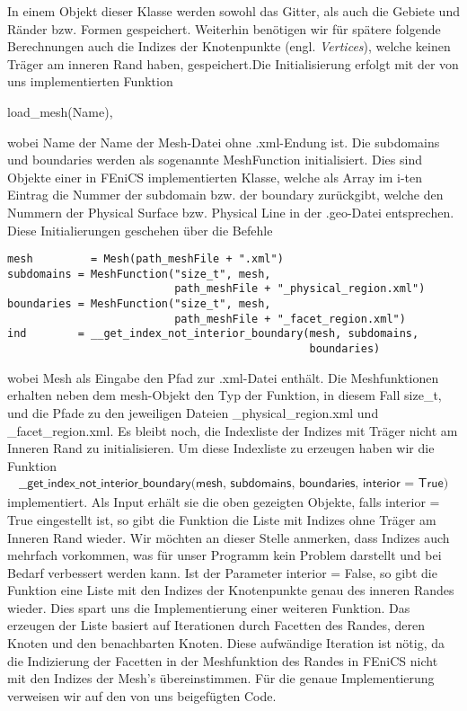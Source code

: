 \documentclass[bibliography=totoc,12pt,a4paper]{scrartcl}
\theoremstyle{exampstyle}
\numberwithin{equation}{section}
\begin{document}
In einem Objekt dieser Klasse werden sowohl das Gitter, als auch die Gebiete und Ränder bzw. Formen gespeichert. Weiterhin benötigen wir für spätere folgende Berechnungen auch die Indizes der Knotenpunkte (engl. \textit{Vertices}), welche keinen Träger am inneren Rand haben, gespeichert.Die Initialisierung erfolgt mit der von uns implementierten Funktion 
\begin{center}
\textsf{load\_mesh(Name)},
\end{center} wobei \textsf{Name} der Name der Mesh-Datei ohne \textsf{.xml}-Endung ist. Die \textsf{subdomains} und \textsf{boundaries} werden als sogenannte \textsf{MeshFunction} initialisiert. Dies sind Objekte einer in FEniCS implementierten Klasse, welche als Array im \textsf{i}-ten Eintrag die Nummer der \textsf{subdomain} bzw. der \textsf{boundary} zurückgibt, welche den Nummern der \textsf{Physical Surface} bzw. \textsf
{Physical Line}  in der \textsf{.geo}-Datei entsprechen. Diese Initialierungen geschehen über die Befehle

\begin{lstlisting}
mesh 	     = Mesh(path_meshFile + ".xml")
subdomains = MeshFunction("size_t", mesh,
                          path_meshFile + "_physical_region.xml")
boundaries = MeshFunction("size_t", mesh, 
                          path_meshFile + "_facet_region.xml")
ind        = __get_index_not_interior_boundary(mesh, subdomains, 
                                               boundaries)  
\end{lstlisting}
wobei \textsf{Mesh} als Eingabe den Pfad zur \textsf{.xml}-Datei enthält. Die Meshfunktionen erhalten neben dem \textsf{mesh}-Objekt den Typ der Funktion, in diesem Fall \textsf{size\_t}, und die Pfade zu den jeweiligen Dateien \textsf{\_physical\_region.xml} und \textsf{\_facet\_region.xml}. Es bleibt noch, die Indexliste der Indizes mit Träger nicht am Inneren Rand zu initialisieren. Um diese Indexliste zu erzeugen haben wir die Funktion 
\begin{align*}
\textsf{\_\_get\_index\_not\_interior\_boundary(mesh, subdomains, 
boundaries, interior = True)}  
\end{align*}
implementiert. Als Input erhält sie die oben gezeigten Objekte, falls \textsf{interior = True} eingestellt ist, so gibt die Funktion die Liste mit Indizes ohne Träger am Inneren Rand wieder. Wir möchten an dieser Stelle anmerken, dass Indizes auch mehrfach vorkommen, was für unser Programm kein Problem darstellt und bei Bedarf verbessert werden kann. Ist der Parameter \textsf{interior = False}, so gibt die Funktion eine Liste mit den Indizes der Knotenpunkte genau des inneren Randes wieder. Dies spart uns die Implementierung einer weiteren Funktion. Das erzeugen der Liste basiert auf Iterationen durch Facetten des Randes, deren Knoten und den benachbarten Knoten. Diese aufwändige Iteration ist nötig, da die Indizierung der Facetten in der Meshfunktion des Randes in FEniCS nicht mit den Indizes der Mesh's übereinstimmen. Für die genaue Implementierung verweisen wir auf den von uns beigefügten Code. 
\end{document}
